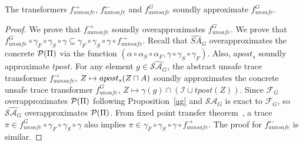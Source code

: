 %
%
%
\begin{theorem}
  The transformers $f_{aunsafe}^{\rightarrow}$, $f_{aunsafe}^{\leftarrow}$ and 
  $f_{aunsafe}^{G}$ soundly approximate $f_{unsafe}^{G}$.
\end{theorem}
\begin{proof}
 We prove that $f_{aunsafe}^{\rightarrow}$ soundly overapproximates 
 $f_{unsafe}^{G}$. 
  We prove that  
  $ f_{unsafe}^{G} \circ \gamma_F \circ \gamma_S \circ \gamma \subseteq 
     \gamma_F \circ \gamma_S \circ \gamma \circ f_{aunsafe}^{\rightarrow} 
  $.
 Recall that $\widehat{SA}_{G}$ overapproximates the concrete
 $\mathcal{P}(\Pi)$ via the function $(\alpha \circ \alpha_S \circ \alpha_F,
 \gamma \circ \gamma_S \circ \gamma_F)$. Also, $apost_s$ soundly approximate
  $tpost$. For any element $g \in \widehat{\mathcal{SA}_{G}}$, the abstract unsafe trace
  transformer $f_{aunsafe}^{\rightarrow}$, $Z \mapsto apost_s(Z \sqcap A)$ 
  soundly approximates the concrete unsafe trace transformer
  $f_{unsafe}^{G}$, $Z \mapsto \gamma(g) \cap (\mathcal{I} \cup tpost(Z))$.
  Since $\mathcal{F}_G$ overapproximates $\mathcal{P}(\Pi)$ following
  Proposition~\ref{ag} and $\mathcal{SA}_G$ is exact to $\mathcal{F}_G$, so
  $\widehat{\mathcal{SA}_G}$ overapproximates $\mathcal{P}(\Pi)$.  From fixed
  point transfer theorem~\cite{fpt}, a trace 
  $\pi \in f_{unsafe}^{G} \circ \gamma_F \circ \gamma_S \circ \gamma$ also
  implies $\pi \in \gamma_F \circ \gamma_S \circ \gamma \circ
  f_{aunsafe}^{\rightarrow}$. The proof for $f_{aunsafe}^{\leftarrow}$ is similar. 
\end{proof}
